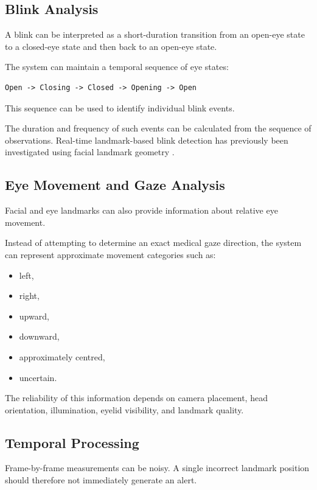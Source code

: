 \documentclass[12pt]{tietreport}
\begin{document}
\subsection{Blink Analysis}

A blink can be interpreted as a short-duration transition from an
open-eye state to a closed-eye state and then back to an open-eye
state.

The system can maintain a temporal sequence of eye states:

\begin{verbatim}
Open -> Closing -> Closed -> Opening -> Open
\end{verbatim}

This sequence can be used to identify individual blink events.

The duration and frequency of such events can be calculated from the
sequence of observations. Real-time landmark-based blink detection has
previously been investigated using facial landmark geometry
\cite{soukupova2016eyeblink}.

\subsection{Eye Movement and Gaze Analysis}

Facial and eye landmarks can also provide information about relative
eye movement.

Instead of attempting to determine an exact medical gaze direction,
the system can represent approximate movement categories such as:

\begin{itemize}[leftmargin=*]
    \item left,
    \item right,
    \item upward,
    \item downward,
    \item approximately centred,
    \item uncertain.
\end{itemize}

The reliability of this information depends on camera placement,
head orientation, illumination, eyelid visibility, and landmark
quality.

\subsection{Temporal Processing}

Frame-by-frame measurements can be noisy. A single incorrect
landmark position should therefore not immediately generate an alert.
\end{document}
